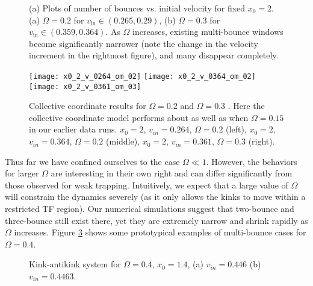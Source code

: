 \documentclass[vecphys]{svmult}		%
\begin{document}
{\begin{figure}[tbp]
\begin{center}
      \subfigure[]{{\texttt{[image: x0\_2\_om\_02]}}}
      \subfigure[]{{\texttt{[image: x0\_2\_om\_03]}}}
  \end{center}
   \caption{(a) Plots of number of bounces vs. initial velocity for fixed $x_0=2$. (a) $\Omega=0.2$ for $v_\mathrm{in} \in (0.265,0.29)$, (b) $\Omega=0.3$ for $v_\mathrm{in} \in (0.359,0.364)  $.  As $\Omega$ increases, existing multi-bounce windows become significantly narrower (note the change in the velocity increment in the rightmost figure), and many disappear completely.}
    \label{fig:windows_Large_Omega}
\end{figure}



\begin{figure}[h]
	\texttt{[image: x0\_2\_v\_0264\_om\_02]}
	\texttt{[image: x0\_2\_v\_0364\_om\_02]}
	\texttt{[image: x0\_2\_v\_0361\_om\_03]}		
	\caption{Collective coordinate results for $\Omega=0.2$ and $\Omega=0.3$ . Here the collective coordinate model performs about as well as when $\Omega=0.15$ in our earlier data runs. $x_0=2$, $v_{in}=0.264$, $\Omega=0.2$ (left), $x_0=2$, $v_{in}=0.364$, $\Omega=0.2$ (middle),  $x_0=2$, $v_{in}=0.361$, $\Omega=0.3$ (right).}
	\label{fig:Omega_02}
\end{figure}

Thus far we have confined ourselves to the case $\Omega \ll 1$. However, the behaviors for larger $\Omega$ are interesting in their own right and can differ significantly from those observed for weak trapping. Intuitively, we expect that a large value of $\Omega$ will constrain the dynamics severely (as
it only allows the kinks to move within a restricted TF region).
Our numerical simulations suggest that two-bounce and three-bounce still exist there, yet
they are extremely narrow and shrink rapidly as $\Omega$ increases.
Figure \ref{big_omega_bounces} shows
some prototypical examples of multi-bounce cases
for $\Omega=0.4$.

\begin{figure}[tbp]
\begin{center}
  \end{center}
    \caption{ Kink-antikink system for $\Omega=0.4$, $x_0=1.4$, (a) $v_{in}=0.446$ (b) $v_{in}=0.4463$. }
\label{big_omega_bounces}
\end{figure}






}
\end{document}
